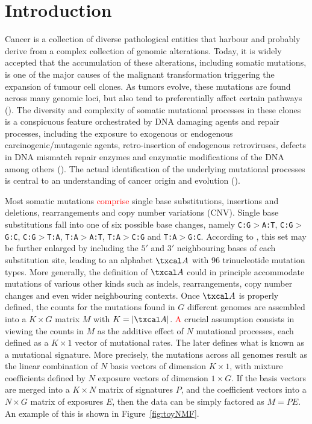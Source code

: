 \documentclass{bioinfo}
\begin{document}
\section{Introduction}
Cancer is a collection of diverse pathological entities that harbour
and probably derive from a complex collection of genomic
alterations. Today, it is widely accepted that the accumulation of
these alterations, including somatic mutations, is one of the major
causes of the malignant transformation triggering the expansion of
tumour cell clones. As tumors evolve, these mutations are found across
many genomic loci, but also tend to preferentially affect certain
pathways (\citealp{CCSS}). The diversity and complexity of somatic
mutational processes in these clones is a conspicuous feature
orchestrated by DNA damaging agents and repair processes, including
the exposure to exogenous or endogenous carcinogenic/mutagenic agents,
retro-insertion of endogenous retroviruses, defects in DNA mismatch
repair enzymes and enzymatic modifications of the DNA among others
(\citealp{RG}). The actual identification of the underlying mutational
processes is central to an understanding of cancer origin and
evolution (\citealp{ANat, AS, HEN, RG}).


Most somatic mutations \textcolor{red}{comprise} single base
substitutions, insertions and deletions, rearrangements and copy
number variations (CNV). Single base substitutions fall into one of
six possible base changes, namely \texttt{C:G}$>$\texttt{A:T},
\texttt{C:G}$>$\texttt{G:C}, \texttt{C:G}$>$\texttt{T:A},
\texttt{T:A}$>$\texttt{A:T}, \texttt{T:A}$>$\texttt{C:G} and
\texttt{T:A}$>$\texttt{G:C}. According to \cite{A}, this set may be
further enlarged by including the $5'$ and $3'$ neighbouring bases of
each substitution site, leading to an alphabet $\txcal A$ with 96
trinucleotide mutation types. More generally, the definition of
$\txcal A$ could in principle accommodate mutations of various other
kinds such as indels, rearrangements, copy number changes and even
wider neighbouring contexts. Once $\txcal A$ is properly defined, the
counts for the mutations found in $G$ different genomes are assembled
into a $K\times G$ matrix $M$ with $K = |\txcal
A|$. \textcolor{red}{A} crucial assumption consists in viewing the
counts in $M$ as the additive effect of $N$ mutational processes, each
defined as a $K\times 1$ vector of mutational rates. The later defines
what is known as a mutational signature. More precisely, the mutations
across all genomes result as the linear combination of $N$ basis
vectors of dimension $K\times 1$, with mixture coefficients defined by
$N$ exposure vectors of dimension $1 \times G$. If the basis vectors
are merged into a $K\times N$ matrix of signatures $P$, and the
coefficient vectors into a $N\times G$ matrix of exposures $E$, then
the data can be simply factored as $M=PE$. An example of this is shown
in Figure~\ref{fig:toyNMF}.
\end{document}
